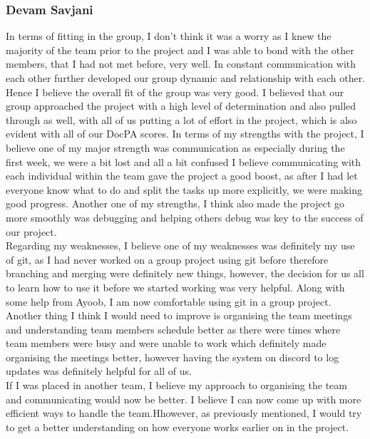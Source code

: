 \documentclass[10pt]{article}
\begin{document}
\subsubsection{Devam Savjani}
In terms of fitting in the group, I don’t think it was a worry as I knew the majority of the team prior to the project and I was able to bond with the other members, that I had not met before, very well. In constant communication with each other further developed our group dynamic and relationship with each other. Hence I believe the overall fit of the group was very good. I believed that our group approached the project with a high level of determination and also pulled through as well, with all of us putting a lot of effort in the project, which is also evident with all of our DocPA scores.
In terms of my strengths with the project, I believe one of my major strength was communication as especially during the first week, we were a bit lost and all a bit confused I believe communicating with each individual within the team gave the project a good boost, as after I had let everyone know what to do and split the tasks up more explicitly, we were making good progress. Another one of my strengths, I think also made the project go more smoothly was debugging and helping others debug was key to the success of our project.
\\Regarding my weaknesses, I believe one of my weaknesses was definitely my use of git, as I had never worked on a group project using git before therefore branching and merging were definitely new things, however, the decision for us all to learn how to use it before we started working was very helpful. Along with some help from Ayoob, I am now comfortable using git in a group project.
\\Another thing I think I would need to improve is organising the team meetings and understanding team members schedule better as there were times where team members were busy and were unable to work which definitely made organising the meetings better, however having the system on discord to log updates was definitely helpful for all of us.
\\If I was placed in another team, I believe my approach to organising the team and communicating would now be better. I believe I can now come up with  more efficient ways to handle the team.Hhowever, as previously mentioned, I would try to get a better understanding on how everyone works earlier on in the project.
\end{document}

